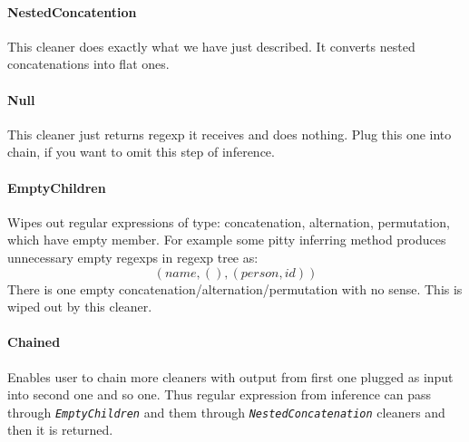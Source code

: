 \documentclass[a4paper,10pt,oneside]{article}
\newcommand{\code}[1]{\texttt{\StrSubstitute{#1}{.}{.\.}}}
\def\.{\discretionary{}{}{}}
\newcommand{\jmodule}[1]{\texttt{\textit{#1}}}
\begin{document}
\paragraph{NestedConcatention}
This cleaner does exactly what we have just described.
It converts nested concatenations into flat ones.

\paragraph{Null}
This cleaner just returns regexp it receives and does nothing.
Plug this one into chain, if you want to omit this step of inference.

\paragraph{EmptyChildren}
Wipes out regular expressions of type: concatenation, alternation, permutation, which have empty \code{children} member.
For example some pitty inferring method produces unnecessary empty regexps in regexp tree as:
$$
(name, (), (person, id))
$$
There is one empty concatenation/alternation/permutation with no sense.
This is wiped out by this cleaner.

\paragraph{Chained}
Enables user to chain more cleaners with output from first one plugged as input into second one and so one.
Thus regular expression from inference can pass through \jmodule{EmptyChildren} and them through \jmodule{NestedConcatenation} cleaners and then it is returned.
\end{document}
